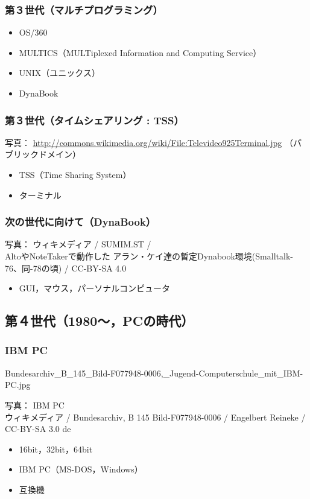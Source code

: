 \documentclass[dvipdfmx]{beamer}
\begin{document}
\begin{frame}
  \frametitle{第３世代（マルチプログラミング）}
  \begin{itemize}
    \item OS/360
    \item MULTICS（MULTiplexed Information and Computing Service）
    \item UNIX（ユニックス）
    \item DynaBook
  \end{itemize}
\end{frame}

\begin{frame}
  \frametitle{第３世代（タイムシェアリング : TSS）}
  \centerline{\tiny 写真：
      \url{http://commons.wikimedia.org/wiki/File:Televideo925Terminal.jpg}
（パブリックドメイン）}
  \begin{itemize}
    \item TSS（Time Sharing System）
    \item ターミナル
  \end{itemize}
\end{frame}

\begin{frame}
  \frametitle{次の世代に向けて（DynaBook）}
  \begin{center}
  {\tiny 写真： ウィキメディア /  SUMIM.ST / \\
    AltoやNoteTakerで動作した
    アラン・ケイ達の暫定Dynabook環境(Smalltalk-76、同-78の頃) /
    CC-BY-SA 4.0}
  \end{center}
  \begin{itemize}
    \item GUI，マウス，パーソナルコンピュータ
  \end{itemize}
\end{frame}

\subsection{第４世代（1980〜，PCの時代）}
\begin{frame}
  \frametitle{IBM PC}
   {Bundesarchiv_B_145_Bild-F077948-0006,_Jugend-Computerschule_mit_IBM-PC.jpg}
      {\tiny
        \begin{center}
          写真： IBM PC \\
          ウィキメディア /
          Bundesarchiv, B 145 Bild-F077948-0006 /
          Engelbert Reineke / CC-BY-SA 3.0 de
        \end{center}
      }
  \begin{itemize}
    \item 16bit，32bit，64bit
    \item IBM PC（MS-DOS，Windows）
    \item 互換機
  \end{itemize}
\end{frame}
\end{document}
